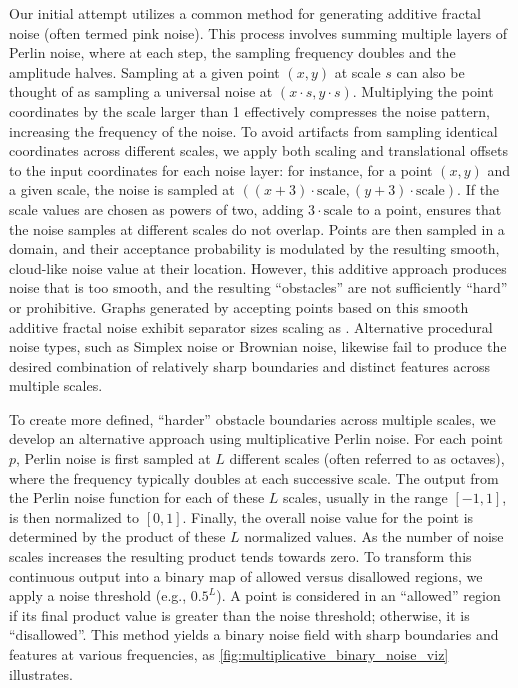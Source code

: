 Our initial attempt utilizes a common method for generating additive fractal noise (often termed pink noise).
This process involves summing multiple layers of Perlin noise, where at each step, the sampling frequency doubles and the amplitude halves.
Sampling at a given point \((x,y)\) at scale \(s\) can also be thought of as sampling a universal noise at \((x \cdot s, y \cdot s)\).
Multiplying the point coordinates by the scale larger than 1 effectively compresses the noise pattern, increasing the frequency of the noise.
To avoid artifacts from sampling identical coordinates across different scales, we apply both scaling and translational offsets to the input coordinates for each noise layer: for instance, for a point \((x,y)\) and a given scale, the noise is sampled at \(((x + 3) \cdot \text{scale}, (y+3) \cdot \text{scale} )\).
If the scale values are chosen as powers of two, adding \(3 \cdot \text{scale}\) to a point, ensures that the noise samples at different scales do not overlap.
Points are then sampled in a domain, and their acceptance probability is modulated by the resulting smooth, cloud-like noise value at their location.
However, this additive approach produces noise that is too smooth, and the resulting \enquote{obstacles} are not sufficiently \enquote{hard} or prohibitive.
Graphs generated by accepting points based on this smooth additive fractal noise exhibit separator sizes scaling as .
Alternative procedural noise types, such as Simplex noise or Brownian noise, likewise fail to produce the desired combination of relatively sharp boundaries and distinct features across multiple scales.

To create more defined, \enquote{harder} obstacle boundaries across multiple scales, we develop an alternative approach using multiplicative Perlin noise.
For each point \(p\), Perlin noise is first sampled at \(L\) different scales (often referred to as octaves), where the frequency typically doubles at each successive scale.
The output from the Perlin noise function for each of these \(L\) scales, usually in the range \([-1, 1]\), is then normalized to \([0, 1]\).
Finally, the overall noise value for the point is determined by the product of these \(L\) normalized values.
As the number of noise scales increases the resulting product tends towards zero.
To transform this continuous output into a binary map of allowed versus disallowed regions, we apply a noise threshold (e.g., \(0.5^L\)).
A point is considered in an \enquote{allowed} region if its final product value is greater than the noise threshold; otherwise, it is \enquote{disallowed}.
This method yields a binary noise field with sharp boundaries and features at various frequencies, as \cref{fig:multiplicative_binary_noise_viz} illustrates.

